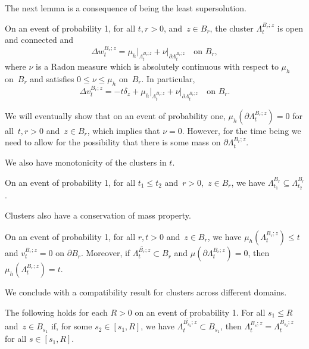 \documentclass[12pt]{amsart}
\numberwithin{equation}{section}
\newcommand{\lss}[2]{\hyperref[eq:least-super-solution]{w^{#1}_{#2}}}
\newcommand{\cluster}[2]{\hyperref[eq:non-co-set]{\mathit{\Lambda}^{#1}_{#2}}}
\newcommand{\odometer}[2]{\hyperref[eq:limit-odometer]{v^{#1}_{#2}}}
\begin{document}
	
	The next lemma is a consequence of being the least supersolution. 
	\begin{lemma} \label{lemma:non-coincidence-open-harmonic}
		On an event of probability 1, for all $t,r > 0$, and~$z \in B_r$,  the cluster $\cluster{B_r;z}{t}$ is open and connected and
		\[
		\Delta \lss{B_r;z}{t} = \mu_h \vert_{\cluster{B_r;z}{t}} + \nu \vert_{\partial {\cluster{B_r;z}{t}}} \quad \mbox{on $B_r$},
		\]
		where $\nu$ is a Radon measure which is absolutely continuous with respect to $\mu_h$ on~$B_r$ and satisfies $0 \leq \nu \leq \mu_h$ on~$B_r$.
		In particular, 
		\[
		\Delta 	\odometer{B_r;z}{t} = -t \delta_z + \mu_h \vert_{{\cluster{B_r;z}{t}}} + \nu \vert_{\partial {\cluster{B_r;z}{t}}} \quad \mbox{on $B_r$}.
		\]
	\end{lemma}
	We will eventually show that on an event of probability one, $\mu_h(\partial {\cluster{B_r;z}{t}}) = 0$ for all~$t, r >0$ and~$z \in B_r$, which implies that $\nu = 0$. However, for the time being we need to allow for the possibility that there is some mass on $\partial {\cluster{B_r;z}{t}}$.
	
	
	
	
	We also have monotonicity of the clusters in $t$. 
	\begin{lemma} \label{lemma:monotonicity}
		On an event of probability 1, for all $t_1 \leq t_2$ and~$r > 0$,~$z \in B_r$, we have $\cluster{B_r}{t_1} \subseteq \cluster{B_r}{t_2}$.
	\end{lemma}
	
	Clusters also have a conservation of mass property. 
	\begin{lemma} \label{lemma:conservation-of-mass}
		On an event of probability 1, for all $r,t > 0$ and~$z \in B_r$, we have $\mu_h({\cluster{B_r;z}{t}}) \leq t$ and $\odometer{B_r;z}{t} = 0$ on $\partial B_r$.  Moreover, if $\overline{{{\cluster{B_r;z}{t}}}} \subset B_r$ and $\mu(\partial {\cluster{B_r;z}{t}}) = 0$, then $\mu_h({\cluster{B_r;z}{t}}) = t$. 
	\end{lemma}
	
	
	
	
	We conclude with a compatibility result for clusters across different domains. 
	\begin{lemma} \label{lemma:cluster-compatibility}
		The following holds for each $R > 0$ on an event of probability 1. 
		For all $s_1 \leq R$ and~$z \in B_{s_1}$ if, for some $s_2 \in [s_1, R]$, we have $\overline{\cluster{B_{s_2};z}{t}} \subset B_{s_1}$, 
		then  $\cluster{B_{s};z}{t} = \cluster{B_{s_2};z}{t}$ for all $s \in [s_1, R]$.
	\end{lemma}
	
\end{document}
